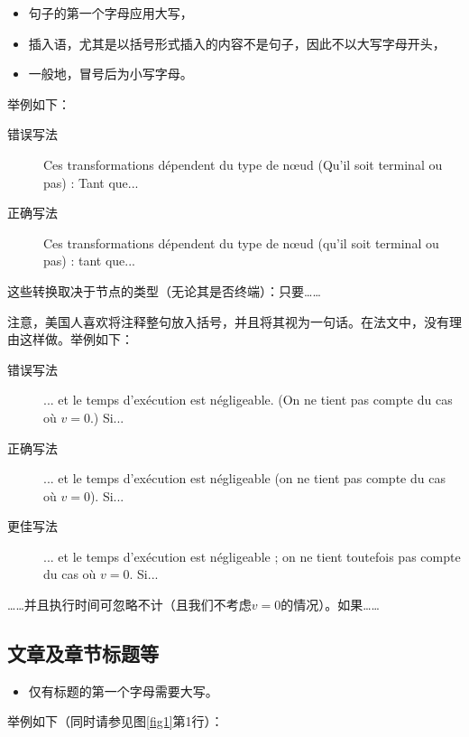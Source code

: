 \begin{itemize}
    \item 句子的第一个字母应用大写，
    \item 插入语，尤其是以括号形式插入的内容不是句子，因此不以大写字母开头，
    \item 一般地，冒号后为小写字母。
\end{itemize}

举例如下：

\begin{description}
    \item[错误写法]  Ces transformations dépendent du type de nœud (Qu’il soit terminal ou pas) : Tant que...
    \item[正确写法] Ces transformations dépendent du type de nœud (qu’il soit terminal ou pas) : tant que...
\end{description}

\begin{bil}
    这些转换取决于节点的类型（无论其是否终端）：只要……
\end{bil}

注意，美国人喜欢将注释整句放入括号，并且将其视为一句话。在法文中，没有理由这样做。举例如下：

\begin{description}
    \item[错误写法] ... et le temps d’exécution est négligeable. (On ne tient pas compte du cas où $v = 0$.) Si...
    \item[正确写法]  ... et le temps d’exécution est négligeable (on ne tient pas compte du cas où $v = 0$). Si...
    \item[更佳写法] ... et le temps d’exécution est négligeable ; on ne tient toutefois pas compte du cas où $v = 0$. Si...
\end{description}

\begin{bil}
    ……并且执行时间可忽略不计（且我们不考虑$v = 0$的情况）。如果……
\end{bil}

\subsection{文章及章节标题等}

\begin{itemize}
    \item 仅有标题的第一个字母需要大写。
\end{itemize}

举例如下（同时请参见图\ref{fig1}第1行）：

